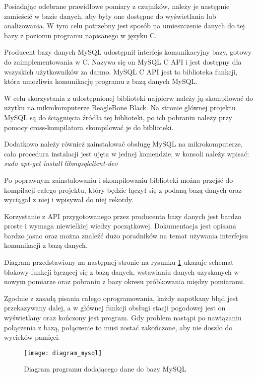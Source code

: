 Posiadając odebrane prawidłowe pomiary z czujników, należy je następnie zamieścić w bazie danych, aby były one dostępne do wyświetlania lub analizowania. W tym celu potrzebny jest sposób na umieszczenie danych do tej bazy z poziomu programu napisanego w języku C.

Producent bazy danych MySQL udostępnił interfejs komunikacyjny bazy, gotowy do zaimplementowania w C. Nazywa się on MySQL C API i jest dostępny dla wszyskich użytkowników za darmo. MySQL C API jest to biblioteka funkcji, która umożliwia komunikację programu z bazą danych MySQL.

W celu skorzystania z udostępnionej biblioteki najpierw należy ją skompilować do użytku na mikrokomputerze BeagleBone Black. Na stronie głównej projektu MySQL są do ściągnięcia źródła tej biblioteki, po ich pobraniu należy przy pomocy cross-kompilatora skompilować je do biblioteki.

Dodatkowo należy również zainstalować obsługę MySQL na mikrokomputerze, cała procedura instalacji jest ujęta w jednej komendzie, w konsoli należy wpisać:\newline
\emph{sudo apt-get install libmysqlclient-dev}

Po poprawnym zainstalowaniu i skompilowaniu biblioteki można przejść do kompilacji całego projektu, który będzie łączył się z podaną bazą danych oraz wyciągał z niej i wpisywał do niej rekordy.

Korzystanie z API przygotowanego przez producenta bazy danych jest bardzo proste i wymaga niewielkiej wiedzy początkowej. Dokumentacja jest opisana bardzo jasno oraz można znaleźć dużo poradników na temat używania interfejsu komunikacji z bazą danych.

Diagram przedstawiony na następnej stronie na rysunku \ref{fig:diagram_mysql} ukazuje schemat blokowy funkcji łączącej się z bazą danych, wstawianiu danych uzyskanych w nowym pomiarze oraz pobraniu z bazy okresu próbkowania między pomiarami.

Zgodnie z zasadą pisania całego oprogramowania, każdy napotkany błąd jest przekazywany dalej, a w głównej funkcji obsługi stacji pogodowej jest on wyświetlany oraz kończony jest program. Gdy problem nastąpi po nawiązaniu połączenia z bazą, połączenie to musi zostać zakończone, aby nie doszło do wycieków pamięci.

\begin{figure}[h]
\centering
\texttt{[image: diagram\_mysql]}
\caption{Diagram programu dodającego dane do bazy MySQL}
\label{fig:diagram_mysql}
\end{figure}
